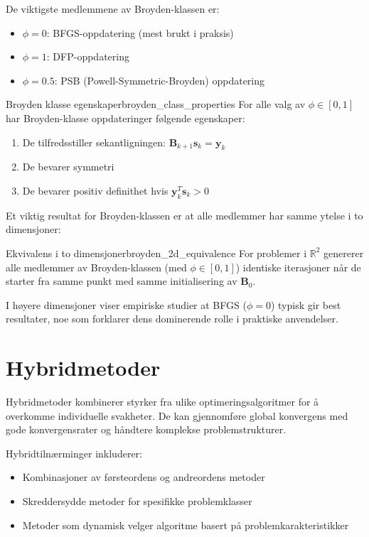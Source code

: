 De viktigste medlemmene av Broyden-klassen er:
\begin{itemize}
	\item $\phi = 0$: BFGS-oppdatering (mest brukt i praksis)
	\item $\phi = 1$: DFP-oppdatering
	\item $\phi = 0.5$: PSB (Powell-Symmetric-Broyden) oppdatering
\end{itemize}

\begin{theorem}{Broyden klasse egenskaper}{broyden_class_properties}
	For alle valg av $\phi \in [0,1]$ har Broyden-klasse oppdateringer følgende egenskaper:
	\begin{enumerate}
		\item De tilfredsstiller sekantligningen: $\symbf{B}_{k+1}\symbf{s}_k = \symbf{y}_k$
		\item De bevarer symmetri
		\item De bevarer positiv definithet hvis $\symbf{y}_k^T\symbf{s}_k > 0$
	\end{enumerate}
\end{theorem}

Et viktig resultat for Broyden-klassen er at alle medlemmer har samme ytelse i to dimensjoner:

\begin{theorem}{Ekvivalens i to dimensjoner}{broyden_2d_equivalence}
	For problemer i $\mathbb{R}^2$ genererer alle medlemmer av Broyden-klassen (med $\phi \in [0,1]$) identiske iterasjoner når de starter fra samme punkt med samme initialisering av $\symbf{B}_0$.
\end{theorem}

I høyere dimensjoner viser empiriske studier at BFGS ($\phi = 0$) typisk gir best resultater, noe som forklarer dens dominerende rolle i praktiske anvendelser.

\section{Hybridmetoder}
\label{sec:hybrid_methods}

Hybridmetoder kombinerer styrker fra ulike optimeringsalgoritmer for å overkomme individuelle svakheter. De kan gjennomføre global konvergens med gode konvergensrater og håndtere komplekse problemstrukturer.

Hybridtilnærminger inkluderer:
\begin{itemize}
	\item Kombinasjoner av førsteordens og andreordens metoder
	\item Skreddersydde metoder for spesifikke problemklasser
	\item Metoder som dynamisk velger algoritme basert på problemkarakteristikker
\end{itemize}

